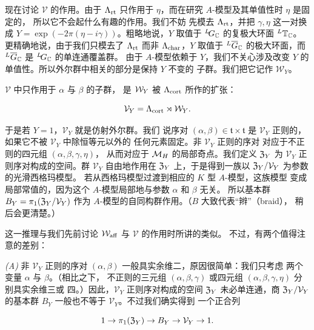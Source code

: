 现在讨论 $\mathcal V$ 的作用。由于 $\Lambda_{\rm rt}$
只作用于 $\eta$，而在研究 $A$-模型及其单值性时 $\eta$ 是固定的，
所以它不会起什么有趣的作用。我们不妨
先模去 $\Lambda_{\rm rt}$，并把 $\gamma,\eta$ 这一对换成
$Y=\exp(-2\pi(\eta-i\gamma))$。粗略地说，$Y$ 取值于
$^L\negthinspace G_{\mathbb{C}}$ 的复极大环面 $^L{\mathbb{T}}_{\mathbb{C}}$。
更精确地说，由于我们只模去了 $\Lambda_{\rm rt}$ 而非
$\Lambda_{\rm char}$，$Y$ 取值于 $^L\overline
G_{\mathbb{C}}$ 的极大环面，而 $^L\overline G_{\mathbb{C}}$ 是 $^L\negthinspace G_{\mathbb{C}}$ 的单连通覆盖群。
由于 $A$-模型依赖于 $Y$，我们不关心涉及改变 $Y$ 的
单值性。所以外尔群中相关的部分是保持 $Y$ 不变的
子群。我们把它记作 ${\mathcal W}_Y$。


$\mathcal V$ 中只作用于 $\alpha$ 与 $\beta$ 的子群，
是 ${\mathcal W}_Y$ 被 $\Lambda_{\rm cort}$ 所作的扩张：

\setcounter{equation}{13}
\begin{equation}\label{eq:4.14}
  {\mathcal V}_Y=\Lambda_{\rm cort}\rtimes {\mathcal W}_Y.
\end{equation}

 于是若 $Y=1$，${\mathcal V}_Y$ 就是仿射外尔群。我们
说序对 $(\alpha,\beta)\in \mathfrak t\times \mathfrak t$ 是
${\mathcal V}_Y$ 正则的，如果它不被 ${\mathcal V}_Y$ 中除恒等元以外的
任何元素固定。非 ${\mathcal V}_Y$ 正则的序对
对应于不正则的四元组 $(\alpha,\beta,\gamma,\eta)$，
从而对应于 ${{\mathcal{M}}_H}$ 的局部奇点。我们定义
$\mathfrak{Z}_Y$ 为 ${\mathcal V}_Y$ 正则序对构成的空间。群 ${\mathcal
V}_Y$ 自由地作用在 $\mathfrak{Z}_Y$ 上，于是得到一族以 $\mathfrak{Z}_Y/{\mathcal V}_Y$ 为参数的光滑西格玛模型。
若从西格玛模型过渡到相应的 $K$ 型 $A$-模型，这族模型
变成局部常值的，因为这个 $A$-模型局部地与参数 $\alpha$ 和 $\beta$ 无关。
所以基本群 $B_Y=\pi_1(\mathfrak{Z}_Y/{\mathcal V}_Y)$ 作为
$A$-模型的自同构群作用。（$B$ 大致代表“辫”（braid），
稍后会更清楚。）

这一推理与我们先前讨论
${\mathcal W}_{\rm aff}$ 与 $\mathcal V$ 的作用时所讲的类似。
不过，有两个值得注意的差别：

{\it (A)} 非 ${\mathcal V}_Y$ 正则的序对 $(\alpha,\beta)$
一般具实余维二，原因很简单：我们只考虑
两个变量 $\alpha$ 与 $\beta$。（相比之下，
不正则的三元组 $(\alpha,\beta,\gamma)$ 或四元组
$(\alpha,\beta,\gamma,\eta)$ 分别具实余维三或
四。）因此，${\mathcal V}_Y$ 正则序对构成的空间 $\mathfrak{Z}_Y$
未必单连通，商 $\mathfrak{Z}_Y/{\mathcal V}_Y$ 的基本群
$B_Y$ 一般也不等于 ${\mathcal V}_Y$。不过我们确实得到
一个正合列

\setcounter{equation}{14}
\begin{equation}\label{eq:4.15}
  1\to \pi_1(\mathfrak{Z}_Y)\to B_Y\to {\mathcal V}_Y\to
1.
\end{equation}


